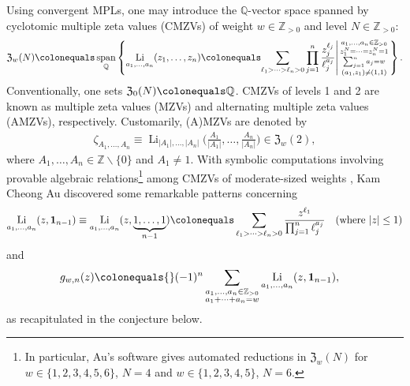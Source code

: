 \documentclass[final,notitlepage,12pt,reqno]{amsart}
\DeclareMathOperator{\Span}{span}
\DeclareMathOperator{\Li}{Li}
\theoremstyle{plain}
\theoremstyle{definition}
\numberwithin{equation}{section}
\begin{document}
Using convergent MPLs, one may introduce the $ \mathbb Q$-vector space spanned by cyclotomic multiple zeta values (CMZVs) of weight $ w\in\mathbb Z_{>0}$ and level $N\in\mathbb Z_{>0}$:\begin{align}
 \mathfrak Z_{w}(N)\colonequals\Span_{\mathbb Q}\left\{\Li_{a_1,\dots,a_n}(z_1,\dots,z_n)\colonequals \smash[b]{\sum\limits_{\ell_{1}>\dots>\ell_{n}>0}\prod\limits_{j=1}^n\frac{\smash[t]{z_{j}^{\ell_{j}}}}{\ell_j^{a_j}}}\middle|\begin{smallmatrix}a_1,\dots,a_n\in\mathbb Z_{>0}\\z_{1}^{N}=\dots=z_n^N=1\\\sum _{j=1}^{n}a_{j}=w\\(a_1,z_1)\neq(1,1)\end{smallmatrix} \right\}.\label{eq:Zk(N)}
\end{align}Conventionally, one sets $ \mathfrak Z_{0}(N) \colonequals \mathbb Q$. CMZVs of levels 1 and 2 are known as multiple zeta values (MZVs) and alternating multiple zeta values (AMZVs), respectively. Customarily, (A)MZVs are  denoted by \begin{align}
\zeta_{A_{1},\dots,A_n}\equiv\Li_{|A_1|,\dots,|A_n|}\bigg(\frac{A_1}{|A_1|},\dots,\frac{A_n}{|A_n|}\bigg)\in \mathfrak Z_{w}(2),
\end{align}where $ A_1,\dots,A_n\in\mathbb Z\smallsetminus\{0\}$ and $ A_1\neq1$. With symbolic computations involving provable algebraic relations\footnote{In particular, Au's software \cite{Au2022a} gives automated reductions  in $ \mathfrak Z_{w}(N)$ for $ w\in\{1,2,3,4,5,6\}$, $N=4$ and  $ w\in\{1,2,3,4,5\}$, $ N=6$.} among CMZVs of mod\-er\-ate-sized weights \cite{Au2022a}, Kam Cheong Au discovered some remarkable patterns concerning \begin{align}\Li_{a_1,\dots,a_n}(z,\mathbf 1_{n-1})
\equiv\Li_{a_1,\dots,a_n}(z,\underset{n-1}{\underbrace{1,\dots,1}})\colonequals \sum_{\ell_{1}>\dots>\ell_{n}>0}\frac{z^{\ell_{1}}}{\prod_{j=1}^n\ell_j^{a_j}}\quad(\text{where } |z|\leq1)
\end{align}and \begin{align}
g_{w,n}(z)\colonequals {}&(-1)^n\sum_{\substack{a_1,\dots,a_n\in\mathbb Z_{>0}\\a_1+\dots+a_n=w}} \Li_{a_1,\dots,a_n}(z,\mathbf 1_{n-1}),\label{eq:g_w,n}
\end{align}
as recapitulated in the conjecture below.
\end{document}
